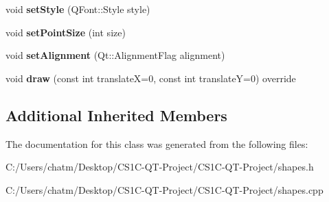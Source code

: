 \begin{DoxyCompactItemize}
\mbox{\label{class_shapes_1_1_text_a8f0ae070e96f096ef684658da9a66a3d}} 
void {\bfseries set\+Style} (Q\+Font\+::\+Style style)
\item 
\mbox{\label{class_shapes_1_1_text_aa400df42d7b81484910b6e8ab0166f01}} 
void {\bfseries set\+Point\+Size} (int size)
\item 
\mbox{\label{class_shapes_1_1_text_a1de163b0a17d3363a5581e9bdf30c99b}} 
void {\bfseries set\+Alignment} (Qt\+::\+Alignment\+Flag alignment)
\item 
\mbox{\label{class_shapes_1_1_text_a8b23773718505294963ad65efad43459}} 
void {\bfseries draw} (const int translateX=0, const int translateY=0) override
\end{DoxyCompactItemize}
\subsection*{Additional Inherited Members}


The documentation for this class was generated from the following files\+:\begin{DoxyCompactItemize}
\item 
C\+:/\+Users/chatm/\+Desktop/\+C\+S1\+C-\/\+Q\+T-\/\+Project/\+C\+S1\+C-\/\+Q\+T-\/\+Project/shapes.\+h\item 
C\+:/\+Users/chatm/\+Desktop/\+C\+S1\+C-\/\+Q\+T-\/\+Project/\+C\+S1\+C-\/\+Q\+T-\/\+Project/shapes.\+cpp\end{DoxyCompactItemize}
